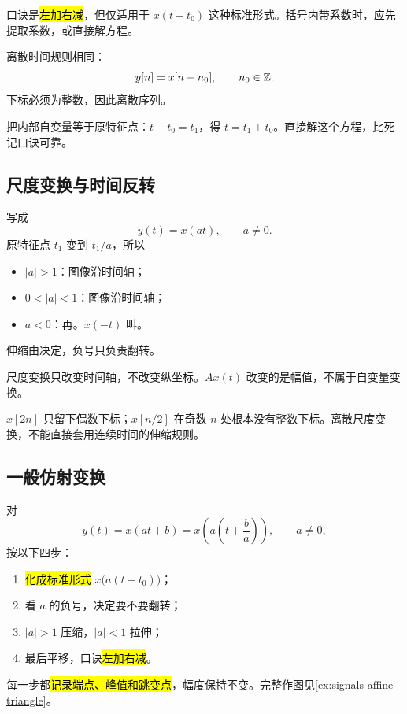 口诀是\hl{左加右减}，但仅适用于 $x(t-t_0)$ 这种标准形式。括号内带系数时，应先提取系数，或直接解方程。

离散时间规则相同：
\[
  y[n]=x[n-n_0],\qquad n_0\in\mathbb{Z}.
\]
下标必须为整数，因此离散序列。

\begin{pitfall}
  把内部自变量等于原特征点：$t-t_0=t_1$，得 $t=t_1+t_0$。直接解这个方程，比死记口诀可靠。
\end{pitfall}

\subsection{尺度变换与时间反转}

写成
\begin{equation}
  y(t)=x(at),\qquad a\ne0.
  \label{eq:continuous-time-scaling}
\end{equation}
原特征点 $t_1$ 变到 $t_1/a$，所以
\begin{itemize}
  \item $|a|>1$：图像沿时间轴；
  \item $0<|a|<1$：图像沿时间轴；
  \item $a<0$：再。$x(-t)$ 叫。
\end{itemize}
伸缩由决定，负号只负责翻转。

尺度变换只改变时间轴，不改变纵坐标。$Ax(t)$ 改变的是幅值，不属于自变量变换。

\begin{pitfall}[离散序列不能照搬伸缩]
  $x[2n]$ 只留下偶数下标；$x[n/2]$ 在奇数 $n$ 处根本没有整数下标。离散尺度变换，不能直接套用连续时间的伸缩规则。
\end{pitfall}

\subsection{一般仿射变换}

对
\begin{equation}
  y(t)=x(at+b)
  =x\!\left(a\left(t+\frac{b}{a}\right)\right),
  \qquad a\ne0,
  \label{eq:affine-time-transformation}
\end{equation}
按以下四步：
\begin{enumerate}
  \item \hl{化成标准形式} $x\bigl(a(t-t_0)\bigr)$；
  \item 看 $a$ 的负号，决定要不要翻转；
  \item $|a|>1$ 压缩，$|a|<1$ 拉伸；
  \item 最后平移，口诀\hl{左加右减}。
\end{enumerate}
每一步都\hl{记录端点、峰值和跳变点}，幅度保持不变。完整作图见\cref{ex:signals-affine-triangle}。

